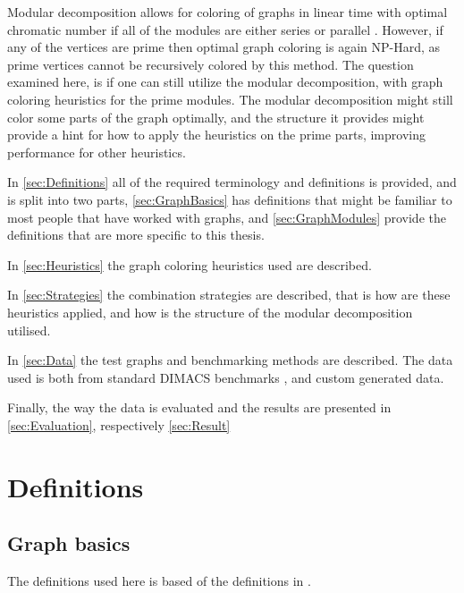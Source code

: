 \documentclass[a4paper]{article}
\begin{document}
Modular decomposition allows for coloring of graphs in linear time with optimal
chromatic number if all of the modules are either  series or
parallel \cite{HCL}. However, if any of the vertices are prime then optimal graph coloring 
is again NP-Hard\cite{NPHard}, as prime vertices cannot be recursively colored by this
method. The question examined here, is if one can still utilize the
modular decomposition, with graph coloring heuristics for the prime modules.
The modular decomposition might still color some parts of the graph optimally,
and the structure it provides might provide a hint for how to apply the
heuristics on the prime parts, improving performance for other heuristics.

In \autoref{sec:Definitions} all of the required terminology and definitions is
provided, and is split into two parts, \autoref{sec:GraphBasics} has definitions that might be
familiar to most people that have worked with graphs, and
\autoref{sec:GraphModules} provide the definitions that are more specific to
this thesis.

In \autoref{sec:Heuristics} the graph coloring heuristics used are described.

In \autoref{sec:Strategies} the combination strategies are described, that is how are
these heuristics applied, and how is the structure of the modular decomposition
utilised.

In \autoref{sec:Data} the test graphs and benchmarking methods are described. The data
used is both from standard DIMACS benchmarks \cite{DIMACS}, and custom generated data.

Finally, the way the data is evaluated and the results are presented in 
\autoref{sec:Evaluation}, respectively \autoref{sec:Result}

\section{Definitions}
\label{sec:Definitions}

\subsection{Graph basics}
\label{sec:GraphBasics}

The definitions used here is based of the definitions in 
\cite{GraphBasics}.
\end{document}
